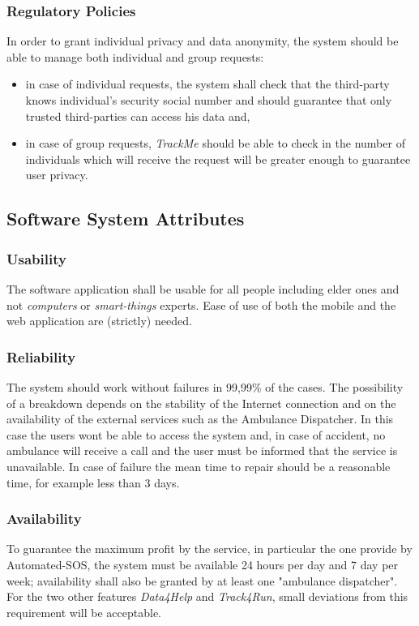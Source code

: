 \documentclass[a4paper]{article}
\begin{document}
        \subsubsection{Regulatory Policies}
        In order to grant individual privacy and data anonymity, the system should be able to manage both individual and group requests:
        \begin{itemize}
            \item in case of individual requests, the system shall check that the third-party knows individual's security social number and should guarantee that only trusted third-parties can access his data and,
            \item in case of group requests, \textit{TrackMe} should be able to check in the number of individuals which will receive the request will be greater enough to guarantee user privacy.
        \end{itemize}
        
        \subsection{Software System Attributes}
        \subsubsection{Usability}
        The software application shall be usable for all people including elder ones and not \textit{computers} or \textit{smart-things} experts. Ease of use of both the mobile and the web application are (strictly) needed.
        
        \subsubsection{Reliability}
        The system should work without failures in 99,99\% of the cases. The possibility of a breakdown depends on the stability of the Internet connection and on the availability of the external services such as the Ambulance Dispatcher. In this case the users wont be able to access the system and, in case of accident, no ambulance will receive a call and the user must be informed that the service is unavailable. In case of failure the mean time to repair should be a reasonable time, for example less than 3 days.
       
        \subsubsection{Availability}
        To guarantee the maximum profit by the service, in particular the one provide by Automated-SOS, the system must be available 24 hours per day and 7 day per week; availability shall also be granted by at least one "ambulance dispatcher". For the two other features \textit{Data4Help} and \textit{Track4Run}, small deviations from this requirement will be acceptable.
        
\end{document}
